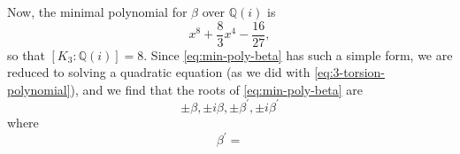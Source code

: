 \documentclass{article}
\theoremstyle{definition}
\begin{document}
Now, the minimal polynomial for $\beta$ over $\mathbb{Q}(i)$ is
\begin{equation}
  \label{eq:min-poly-beta}
  x^{8} + \frac{8}{3}x^{4} - \frac{16}{27},
\end{equation}
so that $[K_{3} : \mathbb{Q}(i) ] = 8$.  Since \eqref{eq:min-poly-beta} has such a
simple form, we are reduced to solving a quadratic equation (as we did with
\eqref{eq:3-torsion-polynomial}), and we find that the roots of
\eqref{eq:min-poly-beta} are
\begin{equation*}
  \pm \beta, \pm i \beta, \pm \beta^{\prime}, \pm i \beta^{\prime}
\end{equation*}
where
\begin{equation*}
  \beta^{\prime} = 
\end{equation*}



\end{document}
